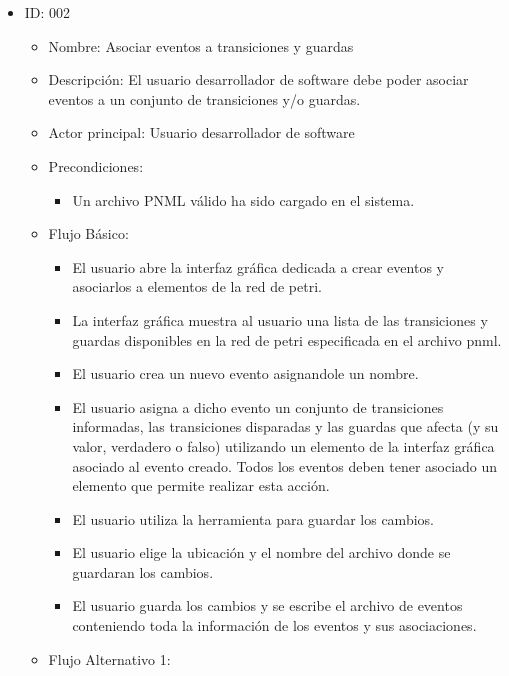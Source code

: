 \begin{itemize}
    
    \item ID: 002
    \begin{itemize}
        \item Nombre: Asociar eventos a transiciones y guardas
        \item Descripción: El usuario desarrollador de software debe poder
        asociar eventos a un conjunto de transiciones y/o guardas.
       	\item Actor principal: Usuario desarrollador de software
       	\item Precondiciones: 
       		\begin{itemize}
       		    \item Un archivo PNML válido ha sido cargado en el sistema.
   		    \end{itemize}
    	\item Flujo Básico: 
       		\begin{itemize}
       		    \item El usuario abre la interfaz gráfica dedicada a crear eventos
       		    y asociarlos a elementos de la red de petri.
       		    \item La interfaz gráfica muestra al usuario una lista de las
       		    transiciones y guardas disponibles en la red de petri especificada
       		    en el archivo pnml.
       		    \item El usuario crea un nuevo evento asignandole un nombre.
       		    \item El usuario asigna a dicho evento un conjunto de
       		    transiciones informadas, las transiciones disparadas y las
       		    guardas que afecta (y su valor, verdadero o falso) utilizando un elemento de la
       		    interfaz gráfica asociado al evento creado. Todos los eventos
       		    deben tener asociado un elemento que permite realizar esta acción.
       		    \item El usuario utiliza la herramienta para guardar los cambios.
       		    \item El usuario elige la ubicación y el nombre del archivo donde
       		    se guardaran los cambios.
       		    \item El usuario guarda los cambios y se escribe el archivo de
       		    eventos conteniendo toda la información de los eventos y sus
       		    asociaciones.
   		    \end{itemize}
       	\item Flujo Alternativo 1: 
       		\begin{itemize}

\end{itemize}
\end{itemize}
\end{itemize}
